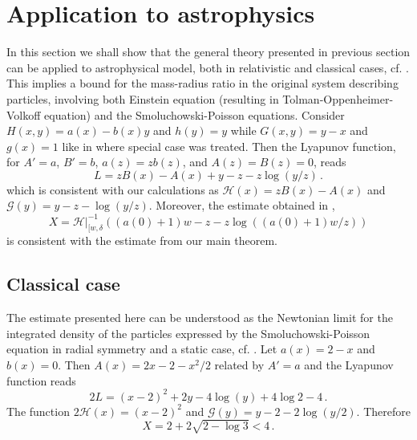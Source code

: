 \documentclass[reqno,10pt]{article}
\theoremstyle{definition}
\numberwithin{equation}{section}
\numberwithin{theorem}{section}
\begin{document}
\section{Application to astrophysics}
In this section we shall show that the general theory presented in previous section can be applied to astrophysical model, both in relativistic and classical cases, cf. \cite{BHN, CMP, JDE, MMAS, DCDS, bibref1, S5K, TMNA}. This implies a bound for the mass-radius ratio in the original system describing particles, involving both Einstein equation (resulting in Tolman-Oppenheimer-Volkoff equation) and the Smoluchowski-Poisson equations.
Consider $H(x,y)=a(x)-b(x)y$ and $h(y)=y$ while $G(x,y)=y-x$ and $g(x)=1$ like in \cite{TMNA} where special case was treated. Then the Lyapunov function, for $A'=a$, $B'=b$, $a(z)=zb(z)$, and $A(z)=B(z)=0$, reads
\[
L=zB(x)-A(x)+y-z-z\log(y/z)\,.
\]
which is consistent with our calculations as ${\mathcal H}(x)=zB(x)-A(x)$ and ${\mathcal G}(y)=y-z-\log(y/z)$. Moreover, the estimate obtained in \cite{TMNA},
\[
X={\mathcal H}|_{[w,\delta}^{-1}((a(0)+1)w-z-z\log ((a(0)+1)w/z))
\]
is consistent with the estimate from our main theorem. 
\subsection{Classical case}
The estimate presented here can be understood as the Newtonian limit for the integrated density of the particles expressed by the Smoluchowski-Poisson equation in radial symmetry and a static case, cf. \cite{BHN, CMP, JDE}.
Let $a(x)=2-x$ and $b(x)=0$. Then $A(x)=2x-2-x^2/2$ related by $A'=a$ and the Lyapunov function reads
\[
2L=(x-2)^2+2y-4\log(y)+4\log 2-4\,.
\]
The function $2{\mathcal H}(x)=(x-2)^2$ and ${\mathcal G}(y)=y-2-2\log (y/2)$. Therefore 
\[
X=2+2\sqrt{2-\log 3}<4\,.
\]
\end{document}
